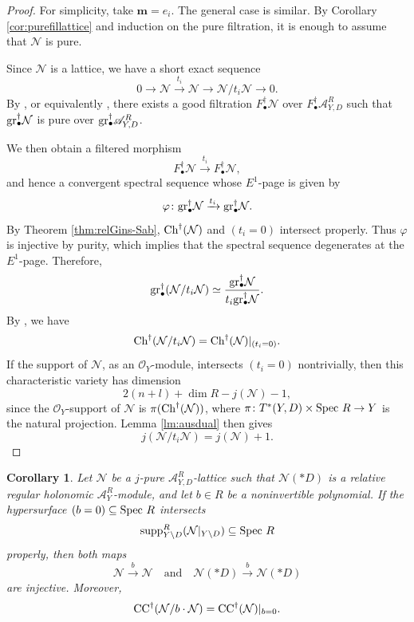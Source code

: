 \documentclass{amsart}
\theoremstyle{plain}
\numberwithin{theorem}{section}
\newtheorem{coro}[theorem]{Corollary}
\theoremstyle{definition}
\theoremstyle{remark}
\theoremstyle{definition}
\newcommand{\cN}{\mathcal{N}}
\newcommand{\cO}{\mathscr{O}}
\newcommand{\bm}{\mathbf{m}}
\newcommand{\gr}{\textup{gr}}
\newcommand{\sA}{\mathscr{A}}
\newcommand{\Spec}{\textup{Spec }}
\newcommand{\supp}{\textup{supp}}
\newcommand{\Ch}{\textup{Ch}}
\newcommand{\CC}{\textup{CC}}
\begin{document}
\begin{proof}
For simplicity, take $\bm=e_i$. The general case is similar. By Corollary \ref{cor:purefillattice} and induction on the pure filtration, it is enough to assume that $\cN$ is pure.

Since $\cN$ is a lattice, we have a short exact sequence
\[
0\to \cN\xrightarrow{t_i}\cN\to \cN/t_i\cN\to0.
\]
By \cite[A.IV 4.10 and 4.11]{BJ}, or equivalently \cite[Prop.4.4.1]{BVWZ}, there exists a good filtration $F_\bullet^\dagger\cN$ over $F^\dagger_\bullet\sA_{Y,D}^R$ such that $\gr^{\dagger}_\bullet\cN$ is pure over $\gr^{\dagger}_\bullet\sA_{Y,D}^R$.

We then obtain a filtered morphism
\[
F^\dagger_\bullet\cN\xrightarrow{t_i}F^\dagger_\bullet\cN,
\]
and hence a convergent spectral sequence whose $E^1$-page is given by
\[
\varphi\colon
\gr^{\dagger}_\bullet\cN
\xrightarrow{t_i}
\gr^{\dagger}_\bullet\cN.
\]
By Theorem \ref{thm:relGins-Sab}, $\Ch^\dagger(\cN)$ and $(t_i=0)$ intersect properly. Thus $\varphi$ is injective by purity, which implies that the spectral sequence degenerates at the $E^1$-page. Therefore,
\[
\gr^\dagger_\bullet(\cN/t_i\cN)
\simeq
\frac{\gr^{\dagger}_\bullet\cN}
{t_i\gr^{\dagger}_\bullet\cN}.
\]
By \cite[Prop.1.5.3]{Gil}, we have
\[
\Ch^\dagger(\cN/t_i\cN)
=
\Ch^\dagger(\cN)|_{(t_i=0)}.
\]
If the support of $\cN$, as an $\cO_Y$-module, intersects $(t_i=0)$ nontrivially, then this characteristic variety has dimension
\[
2(n+l)+\dim R-j(\cN)-1,
\]
since the $\cO_Y$-support of $\cN$ is $\pi(\Ch^\dagger(\cN))$, where
$\pi\colon T^*(Y,D)\times \Spec R\to Y$
is the natural projection. Lemma \ref{lm:ausdual} then gives
\[
j(\cN/t_i\cN)=j(\cN)+1.
\]
\end{proof}

\begin{coro}\label{cor:ccresintprop}
Let $\cN$ be a $j$-pure $\sA_{Y,D}^R$-lattice such that $\cN(*D)$ is a relative regular holonomic $\sA^R_Y$-module, and let $b\in R$ be a noninvertible polynomial. If the hypersurface $(b=0)\subseteq \Spec R$ intersects
\[
\supp^R_{Y\setminus D}(\cN|_{Y\setminus D})\subseteq \Spec R
\]
properly, then both maps
\[
\cN\xrightarrow{b}\cN
\quad \text{and} \quad
\cN(*D)\xrightarrow{b}\cN(*D)
\]
are injective. Moreover,
\[
\CC^\dagger(\cN/b\cdot\cN)
=
\CC^\dagger(\cN)|_{b=0}.
\]
\end{coro}
\end{document}
